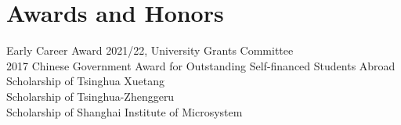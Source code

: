 \documentclass[hidelinks,a4paper]{article}
\begin{document}
\section*{Awards and Honors}
Early Career Award 2021/22, University Grants Committee\\
2017 Chinese Government Award for Outstanding Self-financed Students
Abroad\\
Scholarship of Tsinghua Xuetang\\
Scholarship of Tsinghua-Zhenggeru\\
Scholarship of Shanghai Institute of Microsystem\\

% 
\end{document}
